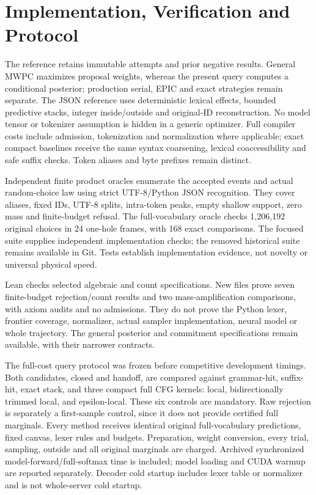 \documentclass[12pt]{article}
\theoremstyle{readable}
\begin{document}
\section{Implementation, Verification and Protocol}

The reference retains immutable attempts and prior negative results. General
MWPC maximizes proposal weights, whereas the present query computes a conditional
posterior; production serial, EPIC and exact strategies remain separate.
The JSON reference uses deterministic lexical effects, bounded predictive
stacks, integer inside/outside and original-ID reconstruction. No model tensor
or tokenizer assumption is hidden in a generic optimizer. Full compiler costs
include admission, tokenization and normalization where applicable; exact
compact baselines receive the same syntax coarsening, lexical coaccessibility
and safe suffix checks. Token aliases and byte prefixes remain distinct.

Independent finite product oracles enumerate the accepted events and actual
random-choice law using strict UTF-8/Python JSON recognition. They cover
aliases, fixed IDs, UTF-8 splits, intra-token peaks, empty shallow support,
zero mass and finite-budget refusal. The full-vocabulary oracle checks
1,206,192 original choices in 24 one-hole frames, with 168 exact comparisons.
The focused suite supplies independent implementation checks; the removed
historical suite remains available in Git. Tests establish implementation evidence,
not novelty or universal physical speed.

Lean checks selected algebraic and count specifications. New files prove
seven finite-budget rejection/count results and two mass-amplification
comparisons, with axiom audits and no admissions. They do not prove the Python
lexer, frontier coverage, normalizer, actual sampler implementation, neural
model or whole trajectory. The general posterior and commitment specifications
remain available, with their narrower contracts.

The full-cost query protocol was frozen before competitive development timings.
Both candidates, closed and handoff, are compared against grammar-hit,
suffix-hit, exact stack, and three compact full CFG kernels: local,
bidirectionally trimmed local, and epsilon-local. These six controls are
mandatory. Raw rejection is separately a first-sample control, since it does
not provide certified full marginals. Every method receives identical original
full-vocabulary predictions, fixed canvas, lexer rules and budgets. Preparation,
weight conversion, every trial, sampling, outside and all original marginals
are charged. Archived synchronized model-forward/full-softmax time is included;
model loading and CUDA warmup are reported separately. Decoder cold startup
includes lexer table or normalizer and is not whole-server cold startup.
\end{document}
